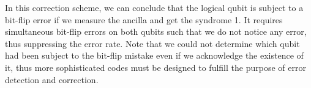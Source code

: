 In this correction scheme, we can conclude that the logical qubit is subject to a bit-flip error if we measure the ancilla and get the syndrome 1. It requires simultaneous bit-flip errors on both qubits such that we do not notice any error, thus suppressing the error rate. Note that we could not determine which qubit had been subject to the bit-flip mistake even if we acknowledge the existence of it, thus more sophisticated codes must be designed to fulfill the purpose of error detection and correction.
